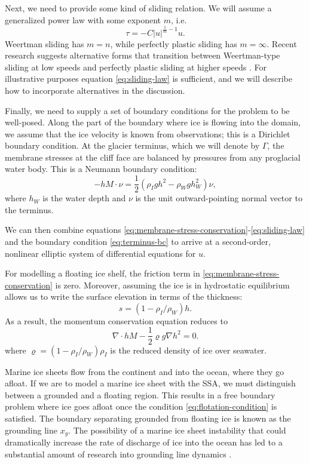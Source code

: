 \documentclass[twocolumn,letterpaper]{igs}
\begin{document}
Next, we need to provide some kind of sliding relation.
We will assume a generalized power law with some exponent $m$, i.e.
\begin{equation}
    \tau = -C|u|^{\frac{1}{m} - 1}u.
    \label{eq:sliding-law}
\end{equation}
Weertman sliding has $m = n$, while perfectly plastic sliding has $m = \infty$.
Recent research suggests alternative forms that transition between Weertman-type sliding at low speeds and perfectly plastic sliding at higher speeds \citep{minchew2020toward}.
For illustrative purposes equation \eqref{eq:sliding-law} is sufficient, and we will describe how to incorporate alternatives in the discussion.

Finally, we need to supply a set of boundary conditions for the problem to be well-posed.
Along the part of the boundary where ice is flowing into the domain, we assume that the ice velocity is known from observations; this is a Dirichlet boundary condition.
At the glacier terminus, which we will denote by $\Gamma$, the membrane stresses at the cliff face are balanced by pressures from any proglacial water body.
This is a Neumann boundary condition:
\begin{equation}
    -hM\cdot\nu = \frac{1}{2}\left(\rho_Igh^2 - \rho_Wgh_W^2\right)\nu,
    \label{eq:terminus-bc}
\end{equation}
where $h_W$ is the water depth and $\nu$ is the unit outward-pointing normal vector to the terminus.

We can then combine equations \eqref{eq:membrane-stress-conservation}-\eqref{eq:sliding-law} and the boundary condition \eqref{eq:terminus-bc} to arrive at a second-order, nonlinear elliptic system of differential equations for $u$.

For modelling a floating ice shelf, the friction term in \eqref{eq:membrane-stress-conservation} is zero.
Moreover, assuming the ice is in hydrostatic equilibrium allows us to write the surface elevation in terms of the thickness:
\begin{equation}
    s = (1 - \rho_I / \rho_W) h.
    \label{eq:flotation-condition}
\end{equation}
As a result, the momentum conservation equation reduces to
\begin{equation}
    \nabla\cdot hM - \frac{1}{2}\varrho g\nabla h^2 = 0.
\end{equation}
where $\varrho = (1 - \rho_I / \rho_W)\rho_I$ is the reduced density of ice over seawater.

Marine ice sheets flow from the continent and into the ocean, where they go afloat.
If we are to model a marine ice sheet with the SSA, we must distinguish between a grounded and a floating region.
This results in a free boundary problem where ice goes afloat once the condition \eqref{eq:flotation-condition} is satisfied.
The boundary separating grounded from floating ice is known as the grounding line $x_g$.
The possibility of a marine ice sheet instability that could dramatically increase the rate of discharge of ice into the ocean has led to a substantial amount of research into grounding line dynamics \citep{schoof2007mis, durand2009mis, favier2012mis}.
\end{document}
